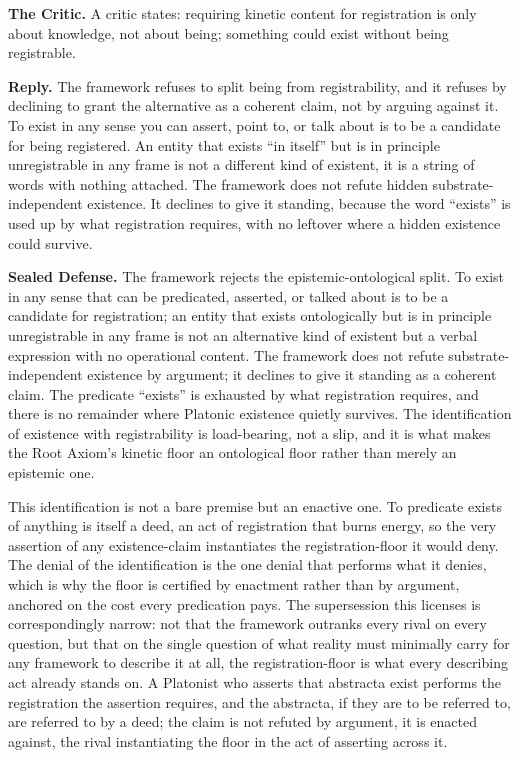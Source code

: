 \documentclass[10pt,twocolumn]{article}
\begin{document}
\textbf{The Critic.} A critic states: requiring kinetic content for
registration is only about knowledge, not about being; something could
exist without being registrable.

\textbf{Reply.} The framework refuses to split being from
registrability, and it refuses by declining to grant the alternative as
a coherent claim, not by arguing against it. To exist in any sense you
can assert, point to, or talk about is to be a candidate for being
registered. An entity that exists ``in itself'' but is in principle
unregistrable in any frame is not a different kind of existent, it is a
string of words with nothing attached. The framework does not refute
hidden substrate-independent existence. It declines to give it standing,
because the word ``exists'' is used up by what registration requires,
with no leftover where a hidden existence could survive.

\textbf{Sealed Defense.} The framework rejects the epistemic-ontological
split. To exist in any sense that can be predicated, asserted, or talked
about is to be a candidate for registration; an entity that exists
ontologically but is in principle unregistrable in any frame is not an
alternative kind of existent but a verbal expression with no operational
content. The framework does not refute substrate-independent existence
by argument; it declines to give it standing as a coherent claim. The
predicate ``exists'' is exhausted by what registration requires, and
there is no remainder where Platonic existence quietly survives. The
identification of existence with registrability is load-bearing, not a
slip, and it is what makes the Root Axiom's kinetic floor an ontological
floor rather than merely an epistemic one.

This identification is not a bare premise but an enactive one. To
predicate exists of anything is itself a deed, an act of registration
that burns energy, so the very assertion of any existence-claim
instantiates the registration-floor it would deny. The denial of the
identification is the one denial that performs what it denies, which is
why the floor is certified by enactment rather than by argument,
anchored on the cost every predication pays. The supersession this
licenses is correspondingly narrow: not that the framework outranks
every rival on every question, but that on the single question of what
reality must minimally carry for any framework to describe it at all,
the registration-floor is what every describing act already stands on. A
Platonist who asserts that abstracta exist performs the registration the
assertion requires, and the abstracta, if they are to be referred to,
are referred to by a deed; the claim is not refuted by argument, it is
enacted against, the rival instantiating the floor in the act of
asserting across it.
\end{document}
